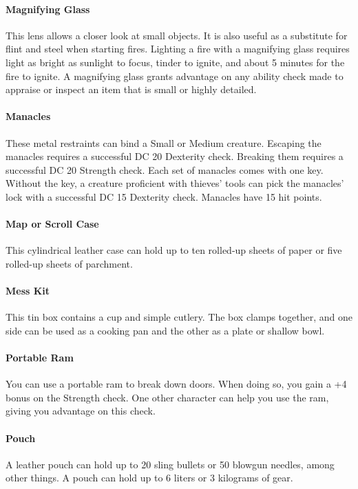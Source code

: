     \paragraph{Magnifying Glass}
        This lens allows a closer look at small objects.
        It is also useful as a substitute for flint and steel when starting fires.
        Lighting a fire with a magnifying glass requires light as bright as sunlight to focus, tinder to ignite, and about 5 minutes for the fire to ignite.
        A magnifying glass grants advantage on any ability check made to appraise or inspect an item that is small or highly detailed.
    \paragraph{Manacles}
        These metal restraints can bind a Small or Medium creature.
        Escaping the manacles requires a successful DC 20 Dexterity check.
        Breaking them requires a successful DC 20 Strength check.
        Each set of manacles comes with one key.
        Without the key, a creature proficient with thieves' tools can pick the manacles' lock with a successful DC 15 Dexterity check.
        Manacles have 15 hit points.
    \paragraph{Map or Scroll Case}
        This cylindrical leather case can hold up to ten rolled-up sheets of paper or five rolled-up sheets of parchment.
    \paragraph{Mess Kit}
        This tin box contains a cup and simple cutlery.
        The box clamps together, and one side can be used as a cooking pan and the other as a plate or shallow bowl.
    \paragraph{Portable Ram}
        You can use a portable ram to break down doors.
        When doing so, you gain a +4 bonus on the Strength check.
        One other character can help you use the ram, giving you advantage on this check.
    \paragraph{Pouch}
        A leather pouch can hold up to 20 sling bullets or 50 blowgun needles, among other things.
        A pouch can hold up to 6 liters or 3 kilograms of gear.
